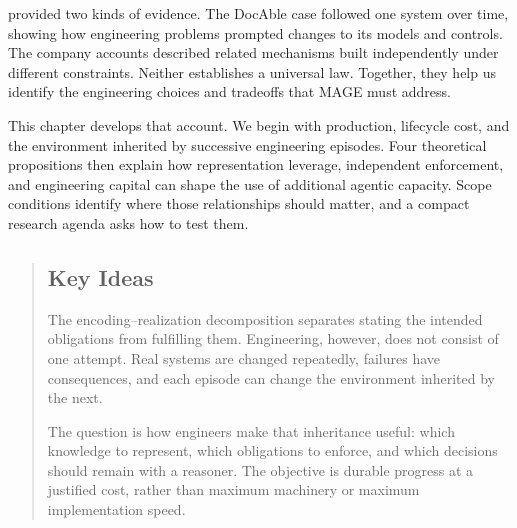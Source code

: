 

 provided two kinds of evidence. The DocAble case followed one system over time, showing how engineering problems prompted changes to its models and controls. The company accounts described related mechanisms built independently under different constraints. Neither establishes a universal law. Together, they help us identify the engineering choices and tradeoffs that MAGE must address.

This chapter develops that account. We begin with production, lifecycle cost, and the environment inherited by successive engineering episodes. Four theoretical propositions then explain how representation leverage, independent enforcement, and engineering capital can shape the use of additional agentic capacity. Scope conditions identify where those relationships should matter, and a compact research agenda asks how to test them.



\begin{quote}
\mbox{}%
\subsection{Key Ideas}\label{heading:the-synthesis}

The encoding–realization decomposition separates stating the intended obligations from fulfilling them. Engineering, however, does not consist of one attempt. Real systems are changed repeatedly, failures have consequences, and each episode can change the environment inherited by the next.

The question is how engineers make that inheritance useful: which knowledge to represent, which obligations to enforce, and which decisions should remain with a reasoner. The objective is durable progress at a justified cost, rather than maximum machinery or maximum implementation speed.
\end{quote}
